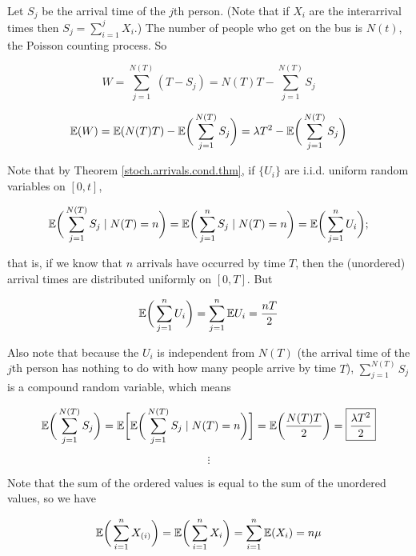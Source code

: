 \begin{solution} Let \(S_j\) be the arrival time of the \(j\)th person. (Note that if \(X_i\) are the interarrival times then \(S_j = \sum_{i=1}^j X_i\).) The number of people who get on the bus is \(N(t)\), the Poisson counting process. So

\[
W = \sum_{j=1}^{N(T)} (T - S_j)   = N(T) T - \sum_{j=1}^{N(T)}S_j
\]

\[
\mathbb{E}(W) = \mathbb{E} ( N(T) T) - \mathbb{E} \bigg(\sum_{j=1}^{N(T)} S_j  \bigg) = \lambda T^2    - \mathbb{E} \bigg(\sum_{j=1}^{N(T)} S_j  \bigg) 
\]

Note that by Theorem \ref{stoch.arrivals.cond.thm}, if \(\{U_i\}\) are i.i.d. uniform random variables on \([0,t]\),

\[
\mathbb{E} \bigg(\sum_{j=1}^{N(T)} S_j \mid N(T) = n \bigg) = \mathbb{E} \bigg(\sum_{j=1}^{n} S_j  \mid N(T) = n\bigg)  = \mathbb{E} \bigg(\sum_{j=1}^{n} U_i \bigg);
\]

that is, if we know that \(n\) arrivals have occurred by time \(T\), then the (unordered) arrival times are distributed uniformly on \([0,T]\). But

\[
 \mathbb{E} \bigg(\sum_{j=1}^{n} U_i \bigg) = \sum_{j=1}^{n} \mathbb{E} U_i = \frac{nT}{2}
\]

Also note that because the \(U_i\) is independent from \(N(T)\) (the arrival time of the \(j\)th person has nothing to do with how many people arrive by time \(T\)), \(\sum_{j=1}^{N(T)} S_j \) is a compound random variable, which means



\[
 \mathbb{E} \bigg(\sum_{j=1}^{N(T)} S_j  \bigg)  = \mathbb{E} \bigg[ \mathbb{E} \bigg(\sum_{j=1}^{N(T)} S_j \mid N(T) = n \bigg) \bigg] = \mathbb{E} \bigg(  \frac{N(T)T}{2} \bigg) = \boxed{ \frac{\lambda T^2}{2} }
\]

%
%
%
%

\[
\vdots
\]

Note that the sum of the ordered values is equal to the sum of the unordered values, so we have 

\[
 \mathbb{E} \bigg(  \sum_{i=1}^n X_{(i)} \bigg) =   \mathbb{E} \bigg(  \sum_{i=1}^n X_{i} \bigg) =  \sum_{i=1}^n \mathbb{E}(X_{i}) = n \mu
\]



\end{solution}

